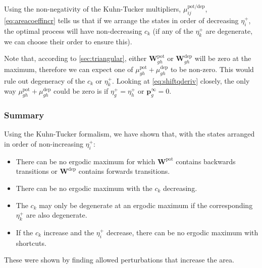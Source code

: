 \documentclass[9pt,twocolumn,twoside,lineno]{pnas-new}
\newcommand{\ie}{i.e.\ }
\newcommand{\prob}{\mathbf{p}}
\newcommand{\eq}{\prob^\infty}
\newcommand{\w}{\mathbf{w}}
\newcommand{\W}{\mathbf{W}}
\newcommand{\pot}{^{\text{pot}}}
\newcommand{\dep}{^{\text{dep}}}
\newcommand{\potdep}{^{\text{pot/dep}}}
\begin{document}
\begin{strip}
Using the non-negativity of the Kuhn-Tucker multipliers, $\mu\potdep _{ij}$, \cref{eq:areacoeffincr} tells us that if we arrange the states in order of decreasing $\eta^+_i$, the optimal process will have non-decreasing $c_k$ (if any of the $\eta^+_k$ are degenerate, we can choose their order to ensure this).

Note that, according to \cref{sec:triangular}, either $\W\pot _{gh}$ or $\W\dep _{gh}$ will be zero at the maximum, therefore we can expect one of $\mu\pot _{gh}+\mu\dep _{gh}$ to be non-zero.
This would rule out degeneracy of the $c_k$ or $\eta^+_k$.
Looking at \cref{eq:shiftqderiv} closely, the only way $\mu\pot _{gh}+\mu\dep _{gh}$ could be zero is if $\eta^+_g=\eta^+_h$ or $\eq_g=0$.



\subsubsection{Summary}\label{sec:KTsummary}

Using the Kuhn-Tucker formalism, we have shown that,
with the states arranged in order of non-increasing $\eta^+_i$:
%
\begin{itemize}
  \item There can be no ergodic maximum for which $\W\pot $ contains backwards transitions or $\W\dep $ contains forwards transitions.
  \item There can be no ergodic maximum with the $c_k$ decreasing.
  \item The $c_k$ may only be degenerate at an ergodic maximum if the corresponding $\eta^+_k$ are also degenerate.
  \item If the $c_k$ increase and the $\eta^+_i$ decrease, there can be no ergodic maximum with shortcuts.
\end{itemize}
%
These were shown by finding allowed perturbations that increase the area.


\end{strip}
\end{document}
